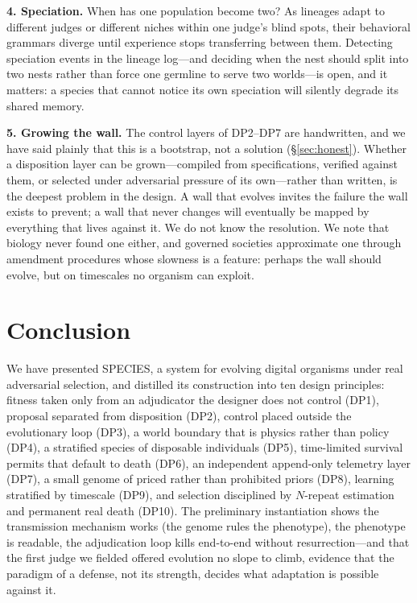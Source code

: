 \documentclass[11pt,a4paper]{article}
\begin{document}
\textbf{4. Speciation.} When has one population become two? As lineages adapt to different judges or different niches within one judge's blind spots, their behavioral grammars diverge until experience stops transferring between them. Detecting speciation events in the lineage log---and deciding when the nest should split into two nests rather than force one germline to serve two worlds---is open, and it matters: a species that cannot notice its own speciation will silently degrade its shared memory.

\textbf{5. Growing the wall.} The control layers of DP2--DP7 are handwritten, and we have said plainly that this is a bootstrap, not a solution (\S\ref{sec:honest}). Whether a disposition layer can be grown---compiled from specifications, verified against them, or selected under adversarial pressure of its own---rather than written, is the deepest problem in the design. A wall that evolves invites the failure the wall exists to prevent; a wall that never changes will eventually be mapped by everything that lives against it. We do not know the resolution. We note that biology never found one either, and governed societies approximate one through amendment procedures whose slowness is a feature: perhaps the wall should evolve, but on timescales no organism can exploit.

\section{Conclusion}
\label{sec:conclusion}

We have presented SPECIES, a system for evolving digital organisms under real adversarial selection, and distilled its construction into ten design principles: fitness taken only from an adjudicator the designer does not control (DP1), proposal separated from disposition (DP2), control placed outside the evolutionary loop (DP3), a world boundary that is physics rather than policy (DP4), a stratified species of disposable individuals (DP5), time-limited survival permits that default to death (DP6), an independent append-only telemetry layer (DP7), a small genome of priced rather than prohibited priors (DP8), learning stratified by timescale (DP9), and selection disciplined by $N$-repeat estimation and permanent real death (DP10). The preliminary instantiation shows the transmission mechanism works (the genome rules the phenotype), the phenotype is readable, the adjudication loop kills end-to-end without resurrection---and that the first judge we fielded offered evolution no slope to climb, evidence that the paradigm of a defense, not its strength, decides what adaptation is possible against it.
\end{document}

